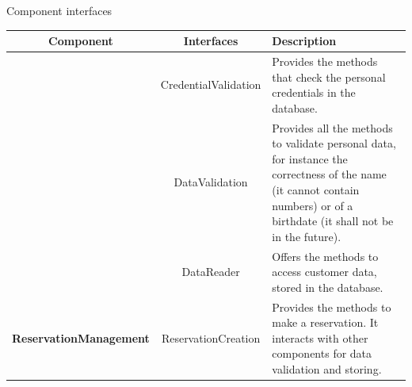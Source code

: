 \begin{frame}[allowframebreaks]{Component interfaces}
\begin{tabularx}{\textwidth}{ >{\ttfamily\bfseries}C{\cW} >{\ttfamily}C{\iW} >{\tiny}X }\toprule%
%
\normalfont\textbf{Component} & \normalfont\textbf{Interfaces} & \normalfont\scriptsize\textbf{Description}
\\\toprule%
%
	&%
	CredentialValidation%
	&%
	\parbox{\cellwidth}{Provides the methods that check the personal credentials in the database.}%
%	
	\\\cmidrule(lr){2-3}%
%	
	&%
	DataValidation%
	&%
	\parbox{\cellwidth}{Provides all the methods to validate personal data, for instance the correctness of the name (it cannot contain numbers) or of a birthdate (it shall not be in the future).}%
%	
	\\\cmidrule(lr){2-3}%
%	
	&%
	DataReader%
	&%
	\parbox{\cellwidth}{Offers the methods to access customer data, stored in the database.}%
%
\\\midrule%
%
	ReservationManagement%
	&%
	ReservationCreation%
	&%
	\parbox{\cellwidth}{Provides the methods to make a reservation. It interacts with other components for data validation and storing.}%
\\%
\bottomrule%
\end{tabularx}%

	
	
	



\end{frame}




